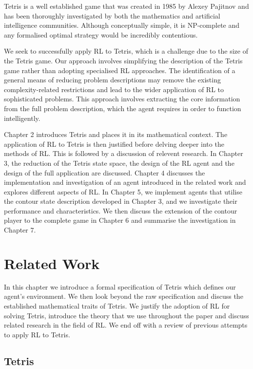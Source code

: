 \documentclass{rucsthesis}
\begin{document}
Tetris is a well established game that was created in 1985 by Alexey Pajitnov and has been thoroughly investigated by both the mathematics and artificial intelligence communities. Although conceptually simple, it is NP-complete \citep{hardtet} and any formalised optimal strategy would be incredibly contentious. 

We seek to successfully apply RL to Tetris, which is a challenge due to the size of the Tetris game. Our approach involves simplifying the description of the Tetris game rather than adopting specialised RL approaches. The identification of a general means of reducing problem descriptions may remove the existing complexity-related restrictions and lead to the wider application of RL to sophisticated problems. This approach involves extracting the core information from the full problem description, which the agent requires in order to function intelligently. 

Chapter 2 introduces Tetris and places it in its mathematical context. The application of RL to Tetris is then justified before delving deeper into the methods of RL. This is followed by a discussion of relevent research. In Chapter 3, the reduction of the Tetris state space, the design of the RL agent and the design of the full application are discussed. Chapter 4 discusses the implementation and investigation of an agent introduced in the related work and explores different aspects of RL.  In Chapter 5, we implement agents that utilise the contour state description developed in Chapter 3, and we investigate their performance and characteristics. We then discuss the extension of the contour player to the complete game in Chapter 6 and summarise the investigation in Chapter 7.

\chapter{Related Work}

In this chapter we introduce a formal specification of Tetris which defines our agent's environment. We then look beyond the raw specification and discuss the established mathematical traits of Tetris. We justify the adoption of RL for solving Tetris, introduce the theory that we use throughout the paper and discuss related research in the field of RL. We end off with a review of previous attempts to apply RL to Tetris.

\section{Tetris}
\end{document}
